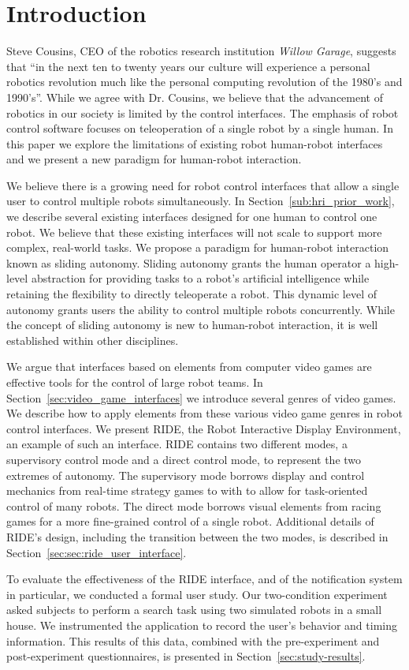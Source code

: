 \chapter{Introduction}
Steve Cousins, CEO of the robotics research institution \emph{Willow Garage}, suggests that ``in the next ten to twenty years our culture will experience a personal robotics revolution much like the personal computing revolution of the 1980's and 1990's''. \cite{Cousins} While we agree with Dr. Cousins, we believe that the advancement of robotics in our society is limited by the control interfaces. The emphasis of robot control software focuses on teleoperation of a single robot by a single human. In this paper we explore the limitations of existing robot human-robot interfaces and we present a new paradigm for human-robot interaction.

We believe there is a growing need for robot control interfaces that allow a single user to control multiple robots simultaneously. In Section~\ref{sub:hri_prior_work}, we describe several existing interfaces designed for one human to control one robot. We believe that these existing interfaces will not scale to support more complex, real-world tasks. We propose a paradigm for human-robot interaction known as sliding autonomy. Sliding autonomy grants the human operator a high-level abstraction for providing tasks to a robot's artificial intelligence while retaining the flexibility to directly teleoperate a robot. This dynamic level of autonomy grants users the ability to control multiple robots concurrently. While the concept of sliding autonomy is new to human-robot interaction, it is well established within other disciplines.

We argue that interfaces based on elements from computer video games are effective tools for the control of large robot teams. In Section~\ref{sec:video_game_interfaces} we introduce several genres of video games. We describe how to apply elements from these various video game genres in robot control interfaces. We present RIDE, the Robot Interactive Display Environment, an example of such an interface. RIDE contains two different modes, a supervisory control mode and a direct control mode, to represent the two extremes of autonomy. The supervisory mode borrows display and control mechanics from real-time strategy games to with to allow for task-oriented control of many robots. The direct mode borrows visual elements from racing games for a more fine-grained control of a single robot. Additional details of RIDE's design, including the transition between the two modes, is described in Section~\ref{sec:sec:ride_user_interface}.

To evaluate the effectiveness of the RIDE interface, and of the notification system in particular, we conducted a formal user study. Our two-condition experiment asked subjects to perform a search task using two simulated robots in a small house. We instrumented the application to record the user's behavior and timing information. This results of this data, combined with the pre-experiment and post-experiment questionnaires, is presented in Section~\ref{sec:study-results}.